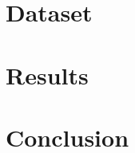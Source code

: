 \section{Dataset} \label{sec:data}
\section{Results} \label{sec:results}
\section{Conclusion} \label{sec:conclusion}
